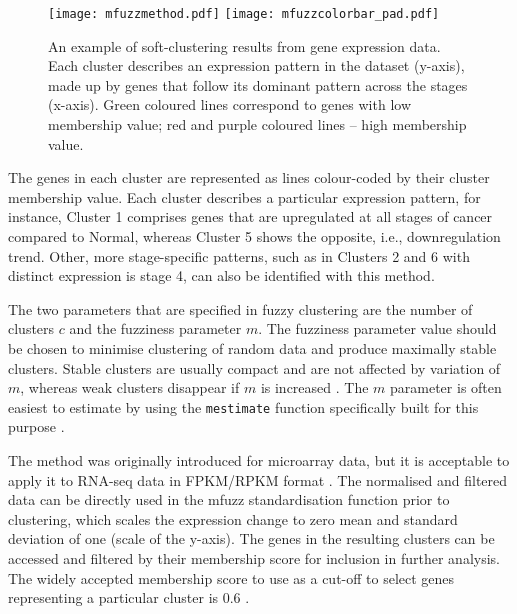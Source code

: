         \begin{figure}[!h]
        \texttt{[image: mfuzzmethod.pdf]}\hfill
        \texttt{[image: mfuzzcolorbar\_pad.pdf]}
        \caption[Soft-clustering plots example]{An example of soft-clustering results from gene expression data. Each cluster describes an expression pattern in the dataset (y-axis), made up by genes that follow its dominant pattern across the stages (x-axis).  Green coloured lines correspond to genes with low membership value; red and purple coloured lines -- high membership value.}
        \label{fig:mfuzzmethod}
        \end{figure}
            
 The genes in each cluster are represented as lines colour-coded by their cluster membership value.  Each cluster describes a particular expression pattern, for instance, Cluster 1 comprises genes that are upregulated at all stages of cancer compared to Normal, whereas Cluster 5 shows the opposite, i.e., downregulation trend. Other, more stage-specific patterns, such as in Clusters 2 and 6 with distinct expression is stage 4, can also be identified with this method. 
 
  
The two parameters that are specified in fuzzy clustering are the number of clusters $c$ and the fuzziness parameter $m$. The fuzziness parameter value should be chosen to minimise clustering of random data and produce maximally stable clusters. Stable clusters are usually compact and are not affected by variation of $m$, whereas weak clusters disappear if $m$ is increased \cite{Kumar2007Mfuzz:Data}. The $m$ parameter is often easiest to estimate by using the \texttt{mestimate} function specifically built for this purpose \cite{Schwammle2010AAnalysis}. 
 
  
 
The method was originally introduced for microarray data, but it is acceptable to apply it to RNA-seq data in FPKM/RPKM format \cite{Futschik2007MfuzzHomepage}.  The normalised and filtered data can be directly used in the mfuzz standardisation function prior to clustering, which scales the expression change to zero mean and standard deviation of one (scale of the y-axis).
The genes in the resulting clusters can be accessed and filtered by their membership score for inclusion in further analysis. The widely accepted membership score to use as a cut-off to select genes representing a particular cluster is 0.6 \cite{chen2016time}. 

